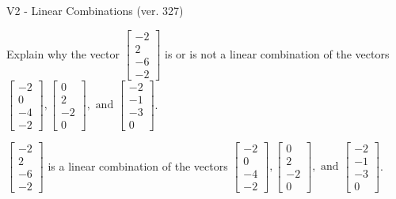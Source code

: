 \begin{exercise}
  \begin{exerciseTitle}V2 - Linear Combinations (ver. 327)\end{exerciseTitle}
  \begin{exerciseStatement}
    Explain why the vector \(\left[\begin{array}{c}
-2 \\
2 \\
-6 \\
-2
\end{array}\right]\)  is or is not a linear 
	combination of the vectors \(\left[\begin{array}{c}
-2 \\
0 \\
-4 \\
-2
\end{array}\right] , \left[\begin{array}{c}
0 \\
2 \\
-2 \\
0
\end{array}\right] , \text{ and } \left[\begin{array}{c}
-2 \\
-1 \\
-3 \\
0
\end{array}\right]\).
	


  \end{exerciseStatement}
  \begin{exerciseAnswer}
   \(\left[\begin{array}{c}
-2 \\
2 \\
-6 \\
-2
\end{array}\right]\) 
  	 is  
	a linear combination of the vectors \(\left[\begin{array}{c}
-2 \\
0 \\
-4 \\
-2
\end{array}\right] , \left[\begin{array}{c}
0 \\
2 \\
-2 \\
0
\end{array}\right] , \text{ and } \left[\begin{array}{c}
-2 \\
-1 \\
-3 \\
0
\end{array}\right]\).

	
  


  \end{exerciseAnswer}
\end{exercise}